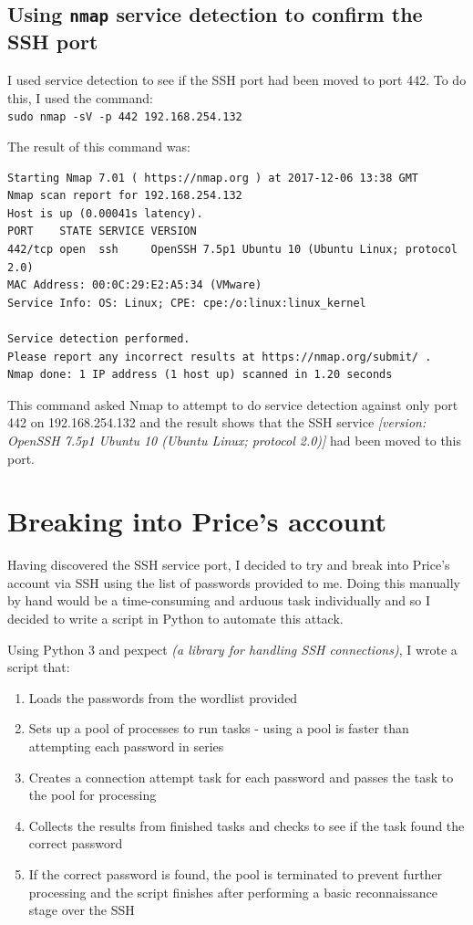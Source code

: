\documentclass[12pt]{report}
\newcommand{\term}[1]{\colorbox{light-gray}{\texttt{#1}}}
\begin{document}
\subsection*{Using \texttt{nmap} service detection to confirm the SSH port}
I used service detection to see if the SSH port had been moved to port 442. To do this, I used the command:\\
\term{sudo nmap -sV -p 442 192.168.254.132}

The result of this command was:
\begin{Verbatim}[frame=leftline]
Starting Nmap 7.01 ( https://nmap.org ) at 2017-12-06 13:38 GMT
Nmap scan report for 192.168.254.132
Host is up (0.00041s latency).
PORT    STATE SERVICE VERSION
442/tcp open  ssh     OpenSSH 7.5p1 Ubuntu 10 (Ubuntu Linux; protocol 2.0)
MAC Address: 00:0C:29:E2:A5:34 (VMware)
Service Info: OS: Linux; CPE: cpe:/o:linux:linux_kernel

Service detection performed.
Please report any incorrect results at https://nmap.org/submit/ .
Nmap done: 1 IP address (1 host up) scanned in 1.20 seconds
\end{Verbatim}

This command asked Nmap to attempt to do service detection against only port 442 on 192.168.254.132 and the result shows that the SSH service \textit{[version: OpenSSH 7.5p1 Ubuntu 10 (Ubuntu Linux; protocol 2.0)]} had been moved to this port.


\section{Breaking into Price's account}
Having discovered the SSH service port, I decided to try and break into Price's account via SSH using the list of passwords provided to me. Doing this manually by hand would be a time-consuming and arduous task individually and so I decided to write a script in Python to automate this attack.

Using Python 3 and pexpect \textit{(a library for handling SSH connections)}, I wrote a script that:
\begin{enumerate}
  \item Loads the passwords from the wordlist provided
  \item Sets up a pool of processes to run tasks - using a pool is faster than attempting each password in series
  \item Creates a connection attempt task for each password and passes the task to the pool for processing
  \item Collects the results from finished tasks and checks to see if the task found the correct password
  \item If the correct password is found, the pool is terminated to prevent further processing and the script finishes after performing a basic reconnaissance stage over the SSH
\end{enumerate}
\end{document}
